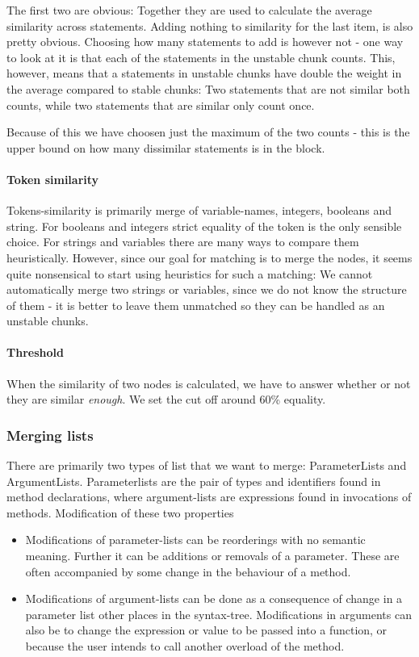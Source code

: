 \documentclass[11pt]{article}
\begin{document}
The first two are obvious: Together they are used to calculate the average similarity across statements. Adding nothing to similarity for the last item, is also pretty obvious. Choosing how many statements to add is however not - one way to look at it is that each of the statements in the unstable chunk counts. This, however, means that a statements in unstable chunks have double the weight in the average compared to stable chunks: Two statements that are not similar both counts, while two statements that are similar only count once.

Because of this we have choosen just the maximum of the two counts - this is the upper bound on how many dissimilar statements is in the block.

\paragraph{Token similarity} Tokens-similarity is primarily merge of variable-names, integers, booleans and string. For booleans and integers strict equality of the token is the only sensible choice. For strings and variables there are many ways to compare them heuristically. However, since our goal for matching is to merge the nodes, it seems quite nonsensical to start using heuristics for such a matching: We cannot automatically merge two strings or variables, since we do not know the structure of them - it is better to leave them unmatched so they can be handled as an unstable chunks.

\paragraph{Threshold} When the similarity of two nodes is calculated, we have to answer whether or not they are similar \textit{enough}. We set the cut off around 60\% equality.


\subsubsection{Merging lists}
There are primarily two types of list that we want to merge: ParameterLists and ArgumentLists. Parameterlists are the pair of types and identifiers found in method declarations, where argument-lists are expressions found in invocations of methods. Modification of these two properties 

\begin{itemize}
   \item Modifications of parameter-lists can be reorderings with no semantic meaning. Further it can be additions or removals of a parameter. These are often accompanied by some change in the behaviour of a method.
   \item Modifications of argument-lists can be done as a consequence of change in a parameter list other places in the syntax-tree. Modifications in arguments can also be to change the expression or value to be passed into a function, or because the user intends to call another overload of the method.
\end{itemize}
\end{document}
